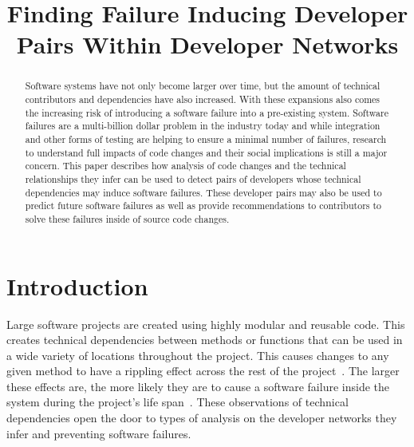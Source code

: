 \documentclass[conference]{IEEEtran}
\begin{document}
\title{Finding Failure Inducing Developer Pairs Within Developer Networks}

\author{
}

\maketitle


\begin{abstract}
Software systems have not only become larger over time, but the amount of
technical contributors and dependencies have also increased. With these expansions also comes
the increasing risk of introducing a software failure into a pre-existing system.
Software failures are a multi-billion dollar problem in the industry today and while integration and
other forms of testing are helping to ensure a minimal number of failures, research to understand
full impacts of code changes and their social implications is still a major concern. This paper describes
how analysis of code changes and the technical relationships they infer can be used to detect pairs
of developers whose technical dependencies may induce software failures. These developer pairs may
also be used to predict future software failures as well as provide recommendations to contributors
to solve these failures inside of source code changes.
\end{abstract}


\section{Introduction}

Large software projects are created using highly modular and 
reusable code. This creates technical dependencies between methods or functions
that can be used in a wide variety of locations throughout the project. 
This causes changes to any given method to have a rippling 
effect across the rest of the project~\cite{Acharya:2011:PCI}. The larger these effects are,
the more likely they are to cause a software failure inside the system during the project's
life span~\cite{Zimmermann:2008:PDU}. These observations of technical dependencies open
the door to types of analysis on the developer networks they infer and preventing software
failures.
\end{document}
